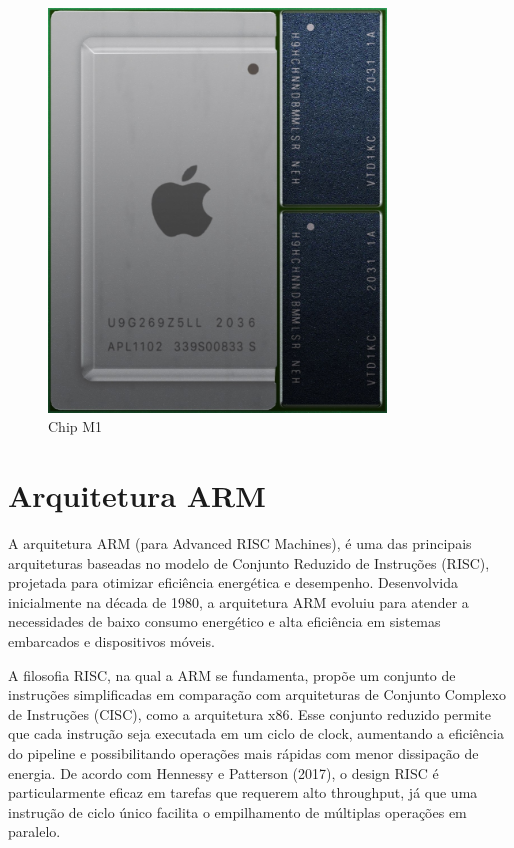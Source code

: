\documentclass[a4paper,times,12pt]{article}
\begin{document}
\begin{figure}[ht]
    \centering
    \includegraphics[width=0.8\textwidth]{./apple.jpeg}
    \caption{Chip M1}
    \label{fig:apple_m1}
\end{figure}


\section{Arquitetura ARM}
\hspace{+15pt}
A arquitetura ARM (para Advanced RISC Machines), é uma das principais arquiteturas baseadas no modelo de Conjunto Reduzido de Instruções (RISC), projetada para otimizar eficiência energética e desempenho. Desenvolvida inicialmente na década de 1980, a arquitetura ARM evoluiu para atender a necessidades de baixo consumo energético e alta eficiência em sistemas embarcados e dispositivos móveis.

A filosofia RISC, na qual a ARM se fundamenta, propõe um conjunto de instruções simplificadas em comparação com arquiteturas de Conjunto Complexo de Instruções (CISC), como a arquitetura x86. Esse conjunto reduzido permite que cada instrução seja executada em um ciclo de clock, aumentando a eficiência do pipeline e possibilitando operações mais rápidas com menor dissipação de energia. De acordo com Hennessy e Patterson (2017), o design RISC é particularmente eficaz em tarefas que requerem alto throughput, já que uma instrução de ciclo único facilita o empilhamento de múltiplas operações em paralelo.
\end{document}

